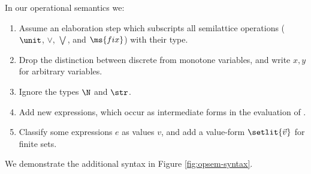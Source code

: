 In our operational semantics we:
\begin{enumerate}
\item Assume an elaboration step which subscripts all semilattice operations
  ($\unit$, $\vee$, $\bigvee$, and $\ms{fix}$) with their type.
\item Drop the distinction between discrete from monotone variables, and write
  $x,y$ for arbitrary variables.
\item Ignore the types $\N$ and $\str$. 
\item Add new  expressions, which occur as intermediate forms in the
  evaluation of .
\item Classify some expressions $e$ as values $v$, and add a value-form
  $\setlit{\vec{v}}$ for finite sets.
\end{enumerate}
We demonstrate the additional syntax in Figure \ref{fig:opsem-syntax}.
